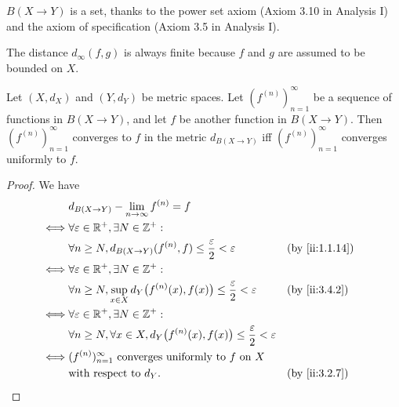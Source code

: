 \begin{note}
  \(B(X \to Y)\) is a set, thanks to the power set axiom (Axiom 3.10 in Analysis I) and the axiom of specification (Axiom 3.5 in Analysis I).
\end{note}

\begin{note}
  The distance \(d_\infty(f, g)\) is always finite because \(f\) and \(g\) are assumed to be bounded on \(X\).
\end{note}

\setcounter{thm}{3}
\begin{prop}\label{ii:3.4.4}
  Let \((X, d_X)\) and \((Y, d_Y)\) be metric spaces.
  Let \((f^{(n)})_{n = 1}^\infty\) be a sequence of functions in \(B(X \to Y)\), and let \(f\) be another function in \(B(X \to Y)\).
  Then \((f^{(n)})_{n = 1}^\infty\) converges to \(f\) in the metric \(d_{B(X \to Y)}\) iff \((f^{(n)})_{n = 1}^\infty\) converges uniformly to \(f\).
\end{prop}

\begin{proof}
  We have
  \begin{align*}
         & d_{B(X \to Y)} - \lim_{n \to \infty} f^{(n)} = f                                                                               \\
    \iff & \forall \varepsilon \in \R^+, \exists N \in \Z^+ :                                                                             \\
         & \forall n \geq N, d_{B(X \to Y)}(f^{(n)}, f) \leq \dfrac{\varepsilon}{2} < \varepsilon                     &  & \by{ii:1.1.14} \\
    \iff & \forall \varepsilon \in \R^+, \exists N \in \Z^+ :                                                                             \\
         & \forall n \geq N, \sup_{x \in X} d_Y\big(f^{(n)}(x), f(x)\big) \leq \dfrac{\varepsilon}{2} < \varepsilon   &  & \by{ii:3.4.2}  \\
    \iff & \forall \varepsilon \in \R^+, \exists N \in \Z^+ :                                                                             \\
         & \forall n \geq N, \forall x \in X, d_Y\big(f^{(n)}(x), f(x)\big) \leq \dfrac{\varepsilon}{2} < \varepsilon                     \\
    \iff & (f^{(n)})_{n = 1}^\infty \text{ converges uniformly to } f \text{ on } X                                                       \\
         & \text{with respect to } d_Y.                                                                               &  & \by{ii:3.2.7}
  \end{align*}
\end{proof}

